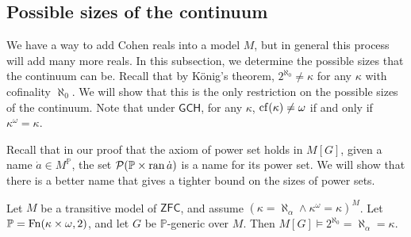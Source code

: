 \subsection{Possible sizes of the continuum}
We have a way to add Cohen reals into a model \( M \), but in general this process will add many more reals.
In this subsection, we determine the possible sizes that the continuum can be.
Recall that by K\"onig's theorem, \( 2^{\aleph_0} \neq \kappa \) for any \( \kappa \) with cofinality \( \aleph_0 \).
We will show that this is the only restriction on the possible sizes of the continuum.
Note that under \( \mathsf{GCH} \), for any \( \kappa \), \( \operatorname{cf}(\kappa) \neq \omega \) if and only if \( \kappa^\omega = \kappa \).

Recall that in our proof that the axiom of power set holds in \( M[G] \), given a name \( \dot a \in M^{\mathbb P} \), the set \( \mathcal P(\mathbb P \times \operatorname{ran} \dot a) \) is a name for its power set.
We will show that there is a better name that gives a tighter bound on the sizes of power sets.
\begin{theorem}
    Let \( M \) be a transitive model of \( \mathsf{ZFC} \), and assume \( (\kappa = \aleph_\alpha \wedge \kappa^\omega = \kappa)^M \).
    Let \( \mathbb P = \operatorname{Fn}(\kappa \times \omega, 2) \), and let \( G \) be \( \mathbb P \)-generic over \( M \).
    Then \( M[G] \vDash 2^{\aleph_0} = \aleph_\alpha = \kappa \).
\end{theorem}
